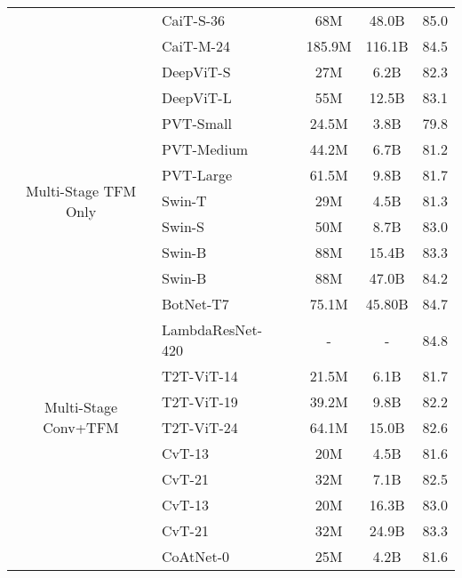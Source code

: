 \documentclass{article}
\newcommand{\name}{CoAtNet\xspace}
\begin{document}
\begin{table}[!ht]
\begin{tabular}{c l c c c c}
        & CaiT-S-36 &  & 68M & 48.0B & 85.0 \\
        & CaiT-M-24 &  & 185.9M & 116.1B & 84.5 \\
        \cmidrule(lr){2-2} \cmidrule(lr){3-3} \cmidrule(lr){4-5} \cmidrule(l){6-6}
        & DeepViT-S &  & 27M & 6.2B &  82.3 \\
        & DeepViT-L &  & 55M & 12.5B &  83.1 \\
        \cmidrule(r){1-2} \cmidrule(lr){3-3} \cmidrule(lr){4-5} \cmidrule(l){6-6}
        \multirow{7}{*}{Multi-Stage TFM Only} 
& PVT-Small  &  & 24.5M & 3.8B & 79.8 \\
        & PVT-Medium &  & 44.2M & 6.7B & 81.2 \\
        & PVT-Large  &  & 61.5M & 9.8B & 81.7 \\
        \cmidrule(lr){2-2} \cmidrule(lr){3-3} \cmidrule(lr){4-5} \cmidrule(l){6-6}
        & Swin-T  &  & 29M  & 4.5B & 81.3 \\
        & Swin-S  &  & 50M  & 8.7B & 83.0 \\
        & Swin-B  &  & 88M  & 15.4B & 83.3 \\
        & Swin-B  &  & 88M  & 47.0B & 84.2 \\
        \cmidrule(r){1-2} \cmidrule(lr){3-3} \cmidrule(lr){4-5} \cmidrule(l){6-6}
        \multirow{9}{*}{Multi-Stage Conv+TFM} 
        & BotNet-T7  &  & 75.1M & 45.80B & 84.7 \\
        & LambdaResNet-420 &  & - & - & 84.8 \\
        \cmidrule(lr){2-2} \cmidrule(lr){3-3} \cmidrule(lr){4-5} \cmidrule(l){6-6}
        & T2T-ViT-14 &  & 21.5M &  6.1B & 81.7 \\
        & T2T-ViT-19 &  & 39.2M &  9.8B & 82.2 \\
        & T2T-ViT-24 &  & 64.1M & 15.0B & 82.6 \\
        \cmidrule(lr){2-2} \cmidrule(lr){3-3} \cmidrule(lr){4-5} \cmidrule(l){6-6}
        & CvT-13   &  & 20M &  4.5B  & 81.6 \\
        & CvT-21   &  & 32M &  7.1B  & 82.5 \\
        & CvT-13   &  & 20M &  16.3B & 83.0 \\
        & CvT-21   &  & 32M &  24.9B & 83.3 \\
        \cmidrule(r){1-2} \cmidrule(lr){3-3} \cmidrule(lr){4-5} \cmidrule(l){6-6}
        \multirow{10}{*}{\makecell{Proposed \\ Multi-Stage Conv+TFM}} 
        & \name-0 &  & 25M  & 4.2B & 81.6 \\

\end{tabular}
\end{table}
\end{document}
